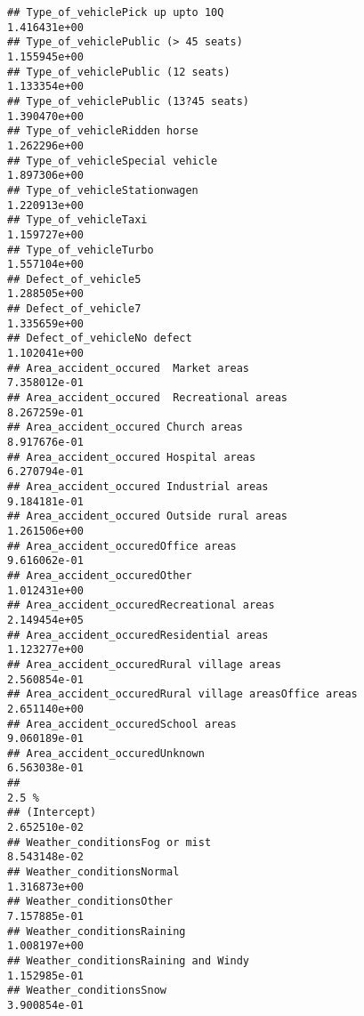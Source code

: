 \documentclass[
]{article}
\begin{document}
\begin{verbatim}
## Type_of_vehiclePick up upto 10Q                              1.416431e+00
## Type_of_vehiclePublic (> 45 seats)                           1.155945e+00
## Type_of_vehiclePublic (12 seats)                             1.133354e+00
## Type_of_vehiclePublic (13?45 seats)                          1.390470e+00
## Type_of_vehicleRidden horse                                  1.262296e+00
## Type_of_vehicleSpecial vehicle                               1.897306e+00
## Type_of_vehicleStationwagen                                  1.220913e+00
## Type_of_vehicleTaxi                                          1.159727e+00
## Type_of_vehicleTurbo                                         1.557104e+00
## Defect_of_vehicle5                                           1.288505e+00
## Defect_of_vehicle7                                           1.335659e+00
## Defect_of_vehicleNo defect                                   1.102041e+00
## Area_accident_occured  Market areas                          7.358012e-01
## Area_accident_occured  Recreational areas                    8.267259e-01
## Area_accident_occured Church areas                           8.917676e-01
## Area_accident_occured Hospital areas                         6.270794e-01
## Area_accident_occured Industrial areas                       9.184181e-01
## Area_accident_occured Outside rural areas                    1.261506e+00
## Area_accident_occuredOffice areas                            9.616062e-01
## Area_accident_occuredOther                                   1.012431e+00
## Area_accident_occuredRecreational areas                      2.149454e+05
## Area_accident_occuredResidential areas                       1.123277e+00
## Area_accident_occuredRural village areas                     2.560854e-01
## Area_accident_occuredRural village areasOffice areas         2.651140e+00
## Area_accident_occuredSchool areas                            9.060189e-01
## Area_accident_occuredUnknown                                 6.563038e-01
##                                                                     2.5 %
## (Intercept)                                                  2.652510e-02
## Weather_conditionsFog or mist                                8.543148e-02
## Weather_conditionsNormal                                     1.316873e+00
## Weather_conditionsOther                                      7.157885e-01
## Weather_conditionsRaining                                    1.008197e+00
## Weather_conditionsRaining and Windy                          1.152985e-01
## Weather_conditionsSnow                                       3.900854e-01

\end{verbatim}
\end{document}
